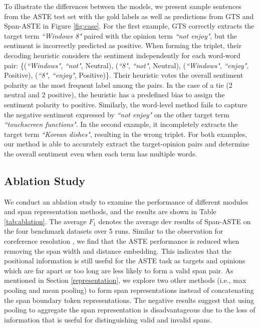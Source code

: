 \documentclass[11pt,a4paper]{article}
\begin{document}
To illustrate the differences between the models, we present sample sentences from the ASTE test set
with the gold labels as well as predictions from GTS \cite{wu-etal-2020-grid} and 
Span-ASTE in Figure \ref{fig:case}. 
For the first example, GTS correctly extracts the target term \textit{``Windows 8"} paired with the opinion term \textit{``not enjoy"}, but the sentiment is incorrectly predicted as positive.
When forming the triplet, their decoding heuristic considers the sentiment independently for each word-word pair: 
\{(\textit{``Windows"}, \textit{``not"}, Neutral), (\textit{``8"}, \textit{``not"}, Neutral), (\textit{``Windows"}, \textit{``enjoy"}, Positive), (\textit{``8"}, \textit{``enjoy"}, Positive)\}.
Their heuristic votes the overall sentiment polarity as the most frequent label among the pairs.
In the case of a tie (2 neutral and 2 positive), the heuristic has a predefined bias to assign the sentiment polarity to positive.
Similarly, the word-level method fails to capture the negative sentiment expressed by \textit{``not enjoy"} on the other target term \textit{``touchscreen functions"}.
In the second example, it incompletely extracts the target term \textit{``Korean dishes"}, resulting in the wrong triplet.
For both examples, our method is able to accurately extract the target-opinion pairs and determine the overall sentiment even when each term has multiple words.





















\subsection{Ablation Study}

We conduct an ablation study to examine the performance of different modules and span representation methods,
and the results are shown in Table  \ref{tab:ablation}. The average $F_1$ denotes the average dev results of 
Span-ASTE on the four benchmark datasets over 5 runs. Similar to the observation for coreference resolution \cite{lee-etal-2017-end}, we find that the ASTE performance is reduced when removing the span width and distance embedding. 
This indicates that the positional information is still useful for the ASTE task as targets and opinions which are far apart or too long are less likely to form a valid span pair.
As mentioned in Section \ref{representation}, we explore two other methods (i.e., max pooling and mean pooling) to form span representations instead of concatenating the span boundary token representations.
The negative results suggest that using pooling to aggregate the span representation is disadvantageous due to the loss of information that is useful for distinguishing valid and invalid spans.
\end{document}
